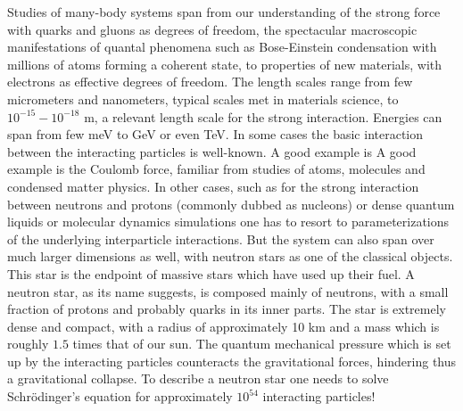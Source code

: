 \documentclass[twoside,english]{uiofysmaster}
\begin{document}
Studies of many-body systems span from our understanding of the strong
force with quarks and gluons as degrees of freedom, the spectacular
macroscopic manifestations of quantal phenomena such as Bose-Einstein
condensation with millions of atoms forming a coherent state, to
properties of new materials, with electrons as effective degrees of
freedom. The length scales range from few micrometers and nanometers,
typical scales met in materials science, to $10^{-15}-10^{-18}$ m, a
relevant length scale for the strong interaction. Energies can span
from few meV to GeV or even TeV.  In some cases the basic interaction
between the interacting particles is well-known.  A good example is
 A good example is
the Coulomb force, familiar from studies of atoms, molecules and
condensed matter physics.  In other cases, such as for the strong
interaction between neutrons and protons (commonly dubbed as nucleons)
or dense quantum liquids or molecular dynamics simulations one has to
resort to parameterizations of the underlying interparticle
interactions.  But the system can also span over much larger
dimensions as well, with neutron stars as one of the classical
objects.  This star is the endpoint of massive stars which have used
up their fuel.  A neutron star, as its name suggests, is composed
mainly of neutrons, with a small fraction of protons and probably
quarks in its inner parts.  The star is extremely dense and compact,
with a radius of approximately 10 km and a mass which is roughly $1.5$
times that of our sun. The quantum mechanical pressure which is set up
by the interacting particles counteracts the gravitational forces,
hindering thus a gravitational collapse.  To describe a neutron star
one needs to solve Schr\"odinger's equation for approximately
$10^{54}$ interacting particles!
\end{document}
